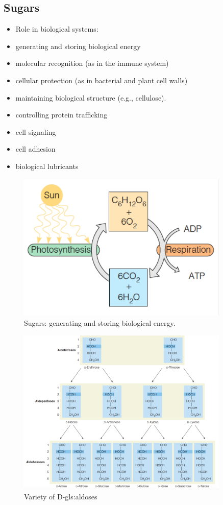 \documentclass[]{article}
\begin{document}
\subsection{Sugars}
\begin{itemize}
	\item Role in biological systems:
	\item generating and storing biological energy
	\item molecular recognition (as in the immune system)
	\item cellular protection (as in bacterial and plant cell 	walls)
	\item maintaining biological structure (e.g., cellulose).
	\item controlling protein trafficking
	\item cell signaling
	\item cell adhesion
	\item biological lubricants
\end{itemize}

\begin{figure}[H]
	\caption{Sugars: generating and storing biological energy.}\label{fig:SugarsCycle} 
	\includegraphics[width=0.9\textwidth]{SugarsCycle}
\end{figure}

\begin{figure}[H]
	\caption{Variety of D-\glspl{gls:aldose}}\label{fig:SugarsStructure} 
	\includegraphics[width=0.9\textwidth]{SugarsStructure}
\end{figure}
\end{document}

